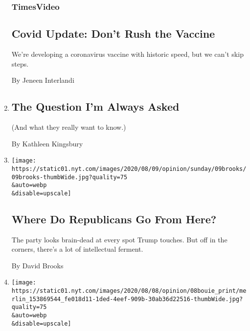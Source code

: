 \begin{enumerate}
  \hypertarget{timesvideo}{%
  \subsubsection{TimesVideo}\label{timesvideo}}

  \hypertarget{covid-update-dont-rush-the-vaccine}{%
  \subsection{Covid Update: Don't Rush the
  Vaccine}\label{covid-update-dont-rush-the-vaccine}}

  We're developing a coronavirus vaccine with historic speed, but we
  can't skip steps.

  By Jeneen Interlandi
\item
  \href{/2020/08/07/opinion/the-question-im-always-asked.html}{}

  \hypertarget{the-question-im-always-asked}{%
  \subsection{The Question I'm Always
  Asked}\label{the-question-im-always-asked}}

  (And what they really want to know.)

  By Kathleen Kingsbury
\item
  \href{/2020/08/07/opinion/sunday/republican-party-trump-2020.html}{}

  \texttt{[image: https://static01.nyt.com/images/2020/08/09/opinion/sunday/09brooks/09brooks-thumbWide.jpg?quality=75\\\&auto=webp\\\&disable=upscale]}

  \hypertarget{where-do-republicans-go-from-here}{%
  \subsection{Where Do Republicans Go From
  Here?}\label{where-do-republicans-go-from-here}}

  The party looks brain-dead at every spot Trump touches. But off in the
  corners, there's a lot of intellectual ferment.

  By David Brooks
\item
  \href{/2020/08/07/opinion/trump-2020-census.html}{}

  \texttt{[image: https://static01.nyt.com/images/2020/08/08/opinion/08bouie\_print/merlin\_153869544\_fe018d11-1ded-4eef-909b-30ab36d22516-thumbWide.jpg?quality=75\\\&auto=webp\\\&disable=upscale]}


\end{enumerate}
